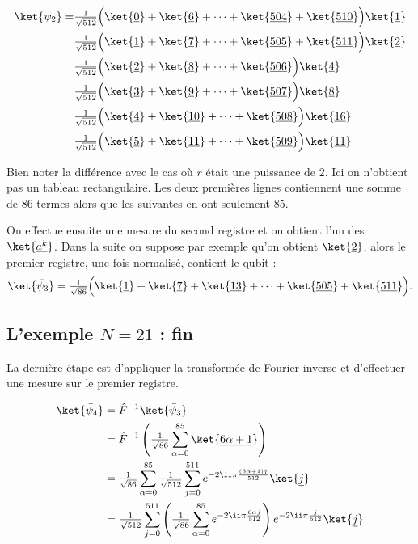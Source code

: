 \documentclass[11pt,class=report,crop=false]{standalone}
\begin{document}
\begin{align*}
\ket{\psi_2} = 
& \tfrac{1}{\sqrt{512}} \Big( \ket{\underline{0}} + \ket{\underline{6}} + \cdots + \ket{\underline{504}} + \ket{\underline{510}} \Big)  \ket{\underline 1} \\
& \tfrac{1}{\sqrt{512}} \Big( \ket{\underline{1}} + \ket{\underline{7}} + \cdots + \ket{\underline{505}} + \ket{\underline{511}} \Big)  \ket{\underline 2} \\
& \tfrac{1}{\sqrt{512}} \Big( \ket{\underline{2}} + \ket{\underline{8}} + \cdots + \ket{\underline{506}} \Big)  \ket{\underline 4} \\
& \tfrac{1}{\sqrt{512}} \Big( \ket{\underline{3}} + \ket{\underline{9}} + \cdots + \ket{\underline{507}} \Big)  \ket{\underline 8} \\
& \tfrac{1}{\sqrt{512}} \Big( \ket{\underline{4}} + \ket{\underline{10}} + \cdots + \ket{\underline{508}} \Big)  \ket{\underline{16}} \\
& \tfrac{1}{\sqrt{512}} \Big( \ket{\underline{5}} + \ket{\underline{11}} + \cdots + \ket{\underline{509}} \Big)  \ket{\underline{11}} \\
\end{align*}

Bien noter la différence avec le cas où $r$ était une puissance de $2$. Ici on n'obtient pas un tableau rectangulaire. Les deux premières lignes contiennent une somme de $86$ termes alors que les suivantes en ont seulement $85$.

On effectue ensuite une mesure du second registre et on obtient l'un des $\ket{\underline {a^k}}$. Dans la suite on suppose par exemple qu'on obtient $\ket{\underline 2}$, alors le premier registre, une fois normalisé, contient le qubit :
$$\ket{\bar \psi_3} = \tfrac{1}{\sqrt{86}} \Big( \ket{\underline{1}} + \ket{\underline{7}} + \ket{\underline{13}} +\cdots + \ket{\underline{505}} + \ket{\underline{511}} \Big).$$


\subsection{L'exemple $N=21$ : fin}

La dernière étape est d'appliquer la transformée de Fourier inverse et d'effectuer une mesure sur le premier registre.

\begin{align*}
\ket{\bar \psi_4}
  &= {\hat F}^{-1} \ket{\bar \psi_3} \\
  &= {\hat F}^{-1} \left( \tfrac{1}{\sqrt{86}} \sum_{\alpha=0}^{85} \ket{\underline{6\alpha + 1}} \right) \\
  &= \tfrac{1}{\sqrt{86}} 
     \sum_{\alpha=0}^{85} \tfrac{1}{\sqrt{512}} 
     \sum_{j=0}^{511} 
     e^{-2\ii \pi \frac{(6\alpha + 1)j}{512}} 
     \ket{\underline j} \\  
&=  \tfrac{1}{\sqrt{512}}
     \sum_{j=0}^{511} 
     \left(
     \tfrac{1}{\sqrt{86}}
     \sum_{\alpha=0}^{85} 
     e^{-2\ii \pi \frac{6\alpha j}{512}} 
     \right) 
     e^{-2\ii \pi \frac{j}{512}} 
     \ket{\underline j} \\   
\end{align*}
\end{document}
